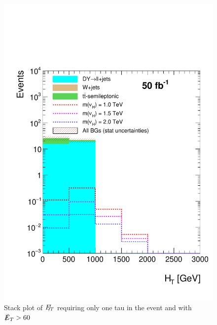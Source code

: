 \begin{figure}
\centering
\includegraphics[width=\linewidth]{StackPlots/HT_2taus_met60_50ifb.pdf}
\caption{Stack plot of $\slashed{E_{T}}$ requiring only one tau in the event and with $\slashed{E}_{T} > 60$}
\label{fig: MET1tauMet60}
\end{figure}

